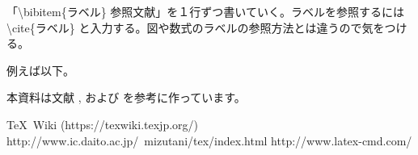 \documentclass{jsarticle}
\begin{document}
「\textbackslash bibitem\{ラベル\} 参照文献」を１行ずつ書いていく。ラベルを参照するには \textbackslash cite\{ラベル\} と入力する。図や数式のラベルの参照方法とは違うので気をつける。

例えば以下。

本資料は文献 \cite{ref1}, \cite{ref2} および \cite{ref3} を参考に作っています。

\begin{thebibliography}{99}
 \TeX ~Wiki (https://texwiki.texjp.org/)
 http://www.ic.daito.ac.jp/~mizutani/tex/index.html
 http://www.latex-cmd.com/
\end{thebibliography}
\end{document}
